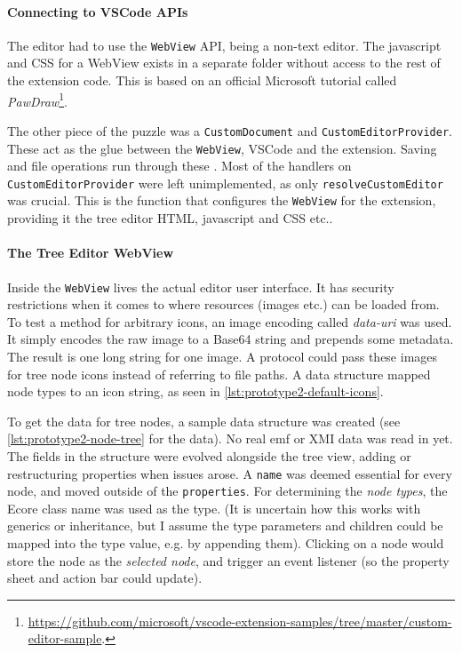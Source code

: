 \paragraph*{Connecting to VSCode APIs}
The editor had to use the \texttt{WebView} \acrshort{API}, being a non-text editor.
The javascript and CSS for a WebView exists in a separate folder without access to the rest of the extension code.
This is based on an official Microsoft tutorial called \emph{PawDraw}\footnote{\href{https://github.com/microsoft/vscode-extension-samples/tree/master/custom-editor-sample}{https://github.com/microsoft/vscode-extension-samples/tree/master/custom-editor-sample}.}.

The other piece of the puzzle was a \texttt{CustomDocument} and \texttt{CustomEditorProvider}.
These act as the glue between the \texttt{WebView}, VSCode and the extension.
Saving and file operations run through these .
Most of the handlers on \texttt{CustomEditorProvider} were left unimplemented, as only \texttt{resolveCustomEditor} was crucial.
This is the function that configures the \texttt{WebView} for the extension, providing it the tree editor HTML, javascript and CSS etc..

\paragraph*{The Tree Editor WebView}
Inside the \texttt{WebView} lives the actual editor user interface.
It has security restrictions when it comes to where resources (images etc.) can be loaded from.
To test a method for arbitrary icons, an image encoding called \emph{data-uri} was used.
It simply encodes the raw image to a Base64 string and prepends some metadata.
The result is one long string for one image.
A protocol could pass these images for tree node icons instead of referring to file paths.
A data structure mapped node types to an icon string, as seen in \cref{lst:prototype2-default-icons}.



To get the data for tree nodes, a sample data structure was created (see \cref{lst:prototype2-node-tree} for the data).
No real \gls{emf} or \gls{XMI} data was read in yet.
The fields in the structure were evolved alongside the tree view, adding or restructuring properties when issues arose.
A \texttt{name} was deemed essential for every node, and moved outside of the \texttt{properties}.
For determining the \emph{node types}, the \gls{Ecore} class name was used as the type.
(It is uncertain how this works with generics or inheritance, but I assume the type parameters and children could be mapped into the type value, e.g. by appending them).
Clicking on a node would store the node as the \emph{selected node}, and trigger an event listener (so the property sheet and action bar could update).

